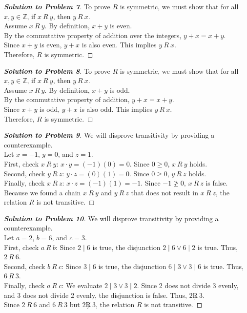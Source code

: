 \documentclass[11pt, a4paper]{article}
\theoremstyle{definition}
\theoremstyle{remark}
\newcommand{\Z}{\mathbb{Z}}
\begin{document}
\begin{proof}[\textbf{Solution to Problem 7}]
To prove $R$ is symmetric, we must show that for all $x, y \in \Z$, if $x \ R \ y$, then $y \ R \ x$. \\
Assume $x \ R \ y$. By definition, $x + y$ is even. \\
By the commutative property of addition over the integers, $y + x = x + y$. \\
Since $x + y$ is even, $y + x$ is also even. This implies $y \ R \ x$. \\
Therefore, $R$ is symmetric.
\end{proof}

\begin{proof}[\textbf{Solution to Problem 8}]
To prove $R$ is symmetric, we must show that for all $x, y \in \Z$, if $x \ R \ y$, then $y \ R \ x$. \\
Assume $x \ R \ y$. By definition, $x + y$ is odd. \\
By the commutative property of addition, $y + x = x + y$. \\
Since $x + y$ is odd, $y + x$ is also odd. This implies $y \ R \ x$. \\
Therefore, $R$ is symmetric.
\end{proof}

\begin{proof}[\textbf{Solution to Problem 9}]
We will disprove transitivity by providing a counterexample. \\
Let $x = -1$, $y = 0$, and $z = 1$. \\
First, check $x \ R \ y$: $x \cdot y = (-1)(0) = 0$. Since $0 \ge 0$, $x \ R \ y$ holds. \\
Second, check $y \ R \ z$: $y \cdot z = (0)(1) = 0$. Since $0 \ge 0$, $y \ R \ z$ holds. \\
Finally, check $x \ R \ z$: $x \cdot z = (-1)(1) = -1$. Since $-1 \not\ge 0$, $x \ R \ z$ is false. \\
Because we found a chain $x \ R \ y$ and $y \ R \ z$ that does not result in $x \ R \ z$, the relation $R$ is not transitive.
\end{proof}

\begin{proof}[\textbf{Solution to Problem 10}]
We will disprove transitivity by providing a counterexample. \\
Let $a = 2$, $b = 6$, and $c = 3$. \\
First, check $a \ R \ b$: Since $2 \mid 6$ is true, the disjunction $2 \mid 6 \lor 6 \mid 2$ is true. Thus, $2 \ R \ 6$. \\
Second, check $b \ R \ c$: Since $3 \mid 6$ is true, the disjunction $6 \mid 3 \lor 3 \mid 6$ is true. Thus, $6 \ R \ 3$. \\
Finally, check $a \ R \ c$: We evaluate $2 \mid 3 \lor 3 \mid 2$. Since 2 does not divide 3 evenly, and 3 does not divide 2 evenly, the disjunction is false. Thus, $2 \not R \ 3$. \\
Since $2 \ R \ 6$ and $6 \ R \ 3$ but $2 \not R \ 3$, the relation $R$ is not transitive.
\end{proof}
\end{document}
